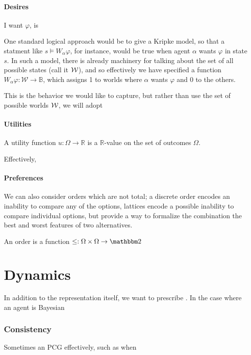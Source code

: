 \documentclass{article}
\begin{document}
	\subsection{Desires}
	
	I want $\varphi$, is 
	
	One standard logical approach would be to give a Kripke model, so that a statment like $s \vDash W_{\alpha} \varphi$, for instance, would be true when agent $\alpha$ wants $\varphi$ in state $s$. In such a model, there is already machinery for talking about the set of all possible states (call it $\cal W$), and so effectively we have specified a function $W_\alpha \varphi: \mathcal W \to \mathbb B$, which assigns 1 to worlds where $\alpha$ wants $\varphi$ and 0 to the others.
	
	This is the behavior we would like to capture, but rather than use the set of possible worlds $\cal W$, we will adopt 
	
	
	\subsection{Utilities}
	
		
	
	A utility function $u : \Omega \to \mathbb R$ is a $\mathbb R$-value on the set of outcomes $\Omega$. 
	
	Effectively, 

	
	\subsection{Preferences}
	We can also consider orders which are not total; a discrete order encodes an inability to compare any of the options, lattices encode a possible inability to compare individual options, but provide a way to formalize the combination the best and worst features of two alternatives.
	
	
	An order is a function $\leq: \Omega \times \Omega \to \mathbbm 2$
	
	\part{Dynamics}
	In addition to the representation itself, we want to prescribe . 
	In the case where an agent is Bayesian 
	
	\section{Consistency}
	Sometimes an PCG effectively, such as when 
%	
	
\end{document}

